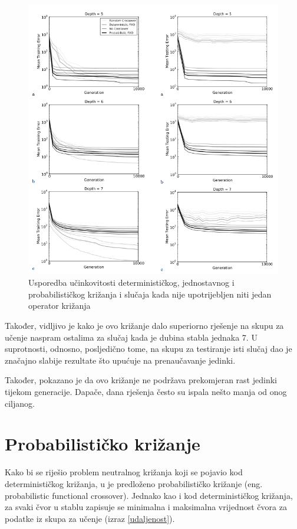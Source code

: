 \begin{figure}[H]
	\centering
	\includegraphics[scale=0.65]{./slike/deto.png}
	\caption{Usporedba učinkovitosti determinističkog, jednostavnog i probabilističkog križanja i slučaja kada nije upotrijebljen niti jedan operator križanja}
	\label{deto}
\end{figure}

Također, vidljivo je kako je ovo križanje dalo superiorno rješenje na skupu za učenje naspram ostalima za slučaj kada je dubina stabla jednaka 7. U suprotnosti, odnosno, posljedično tome, na skupu za testiranje isti slučaj dao je značajno slabije rezultate što upućuje na prenaučavanje jedinki.

Također, pokazano je da ovo križanje ne podržava prekomjeran rast jedinki tijekom generacije. Dapače, dana rješenja često su ispala nešto manja od onog ciljanog.




\section{Probabilističko križanje}

Kako bi se riješio problem neutralnog križanja koji se pojavio kod determinističkog križanja, u \cite{crxDeter} je predloženo probabilističko križanje (eng. probabilistic functional crossover). Jednako kao i kod determinističkog križanja, za svaki čvor u stablu zapisuje se minimalna i maksimalna vrijednost čvora za podatke iz skupa za učenje (izraz \ref{udaljenost}).

